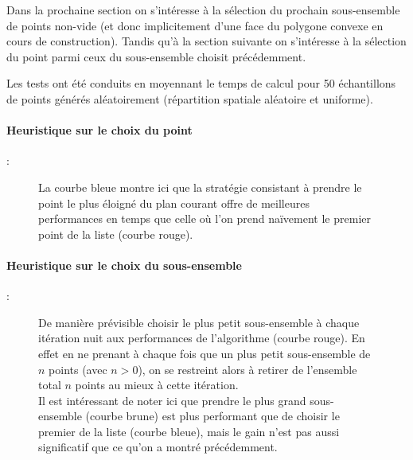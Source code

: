 \documentclass[]{article}
\begin{document}
Dans la prochaine section on s'intéresse à la sélection du prochain sous-ensemble de points non-vide (et donc implicitement d'une face du polygone convexe en cours de construction).
Tandis qu'à la section suivante on s'intéresse à la sélection du point parmi ceux du sous-ensemble choisit précédemment.

Les tests ont été conduits en moyennant le temps de calcul pour 50 échantillons de points générés aléatoirement (répartition spatiale aléatoire et uniforme).

\paragraph{Heuristique sur le choix du point} :
\begin{figure}[H]
	\caption{La courbe bleue montre ici que la stratégie consistant à prendre le point le plus éloigné du plan courant offre de meilleures performances en temps que celle où l'on prend naïvement le premier point de la liste (courbe rouge).}
\end{figure}

\paragraph{Heuristique sur le choix du sous-ensemble} :
\begin{figure}[H]
	\caption{
		De manière prévisible choisir le plus petit sous-ensemble à chaque itération nuit aux performances de l'algorithme (courbe rouge). En effet en ne prenant à chaque fois que un plus petit sous-ensemble de $n$ points (avec $n > 0$), on se restreint alors à retirer de l'ensemble total $n$ points au mieux à cette itération.\\
		Il est intéressant de noter ici que prendre le plus grand sous-ensemble (courbe brune) est plus performant que de choisir le premier de la liste (courbe bleue), mais le gain n'est pas aussi significatif que ce qu'on a montré précédemment.
	}
\end{figure}
\end{document}

